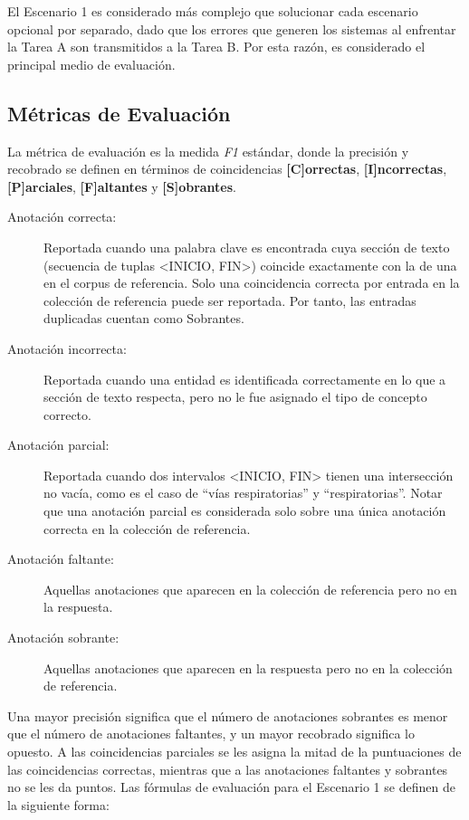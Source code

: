 El Escenario 1 es considerado más complejo que solucionar cada escenario opcional por separado, dado que los errores que generen los sistemas al enfrentar la Tarea A son transmitidos a la Tarea B.
Por esta razón, es considerado el principal medio de evaluación.

\subsection{Métricas de Evaluación}

La métrica de evaluación es la medida \textit{F1} estándar, donde la precisión y recobrado se definen en términos de coincidencias \textbf{[C]orrectas}, \textbf{[I]ncorrectas},
\textbf{[P]arciales}, \textbf{[F]altantes} y \textbf{[S]obrantes}.


\begin{description}
	
	\item[Anotación correcta:] Reportada cuando una palabra clave es encontrada cuya sección de texto (secuencia de tuplas <INICIO, FIN>) coincide	exactamente con la de una en el corpus de referencia.
	Solo una coincidencia correcta por entrada en la colección de referencia puede ser reportada.
	Por tanto, las entradas duplicadas cuentan como Sobrantes.
	
	\item[Anotación incorrecta:] Reportada cuando una entidad es identificada correctamente en lo que a sección de texto respecta, pero no le fue asignado el tipo de concepto correcto.
	
	\item[Anotación parcial:] Reportada cuando dos intervalos <INICIO, FIN> tienen una intersección no vacía, como es el caso de “vías respiratorias”	y “respiratorias”.
	Notar que una anotación parcial es considerada solo sobre una única anotación correcta en la colección de referencia.
	
	\item[Anotación faltante:] Aquellas anotaciones que aparecen en la colección de	referencia pero no en la respuesta.
	
	\item[Anotación sobrante:] Aquellas anotaciones que aparecen en la respuesta pero no en la colección de referencia.
	
\end{description}

Una mayor precisión significa que el número de anotaciones sobrantes
es menor que el número de anotaciones faltantes, y un mayor recobrado significa lo opuesto.
A las coincidencias parciales se les asigna la mitad de la
puntuaciones de las coincidencias correctas, mientras que a las anotaciones faltantes y sobrantes no se les da puntos.
Las fórmulas de evaluación para el Escenario 1 se definen de la siguiente forma:

